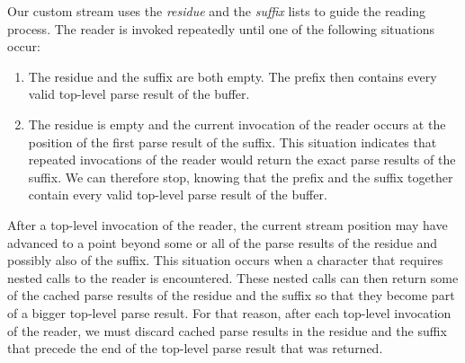 Our custom stream uses the \emph{residue} and the \emph{suffix} lists
to guide the reading process.  The reader is invoked repeatedly until
one of the following situations occur:

\begin{enumerate}
\item The residue and the suffix are both empty.  The prefix then
  contains every valid top-level parse result of the buffer.
\item The residue is empty and the current invocation of the reader
  occurs at the position of the first parse result of the suffix.
  This situation indicates that repeated invocations of the reader
  would return the exact parse results of the suffix.  We can
  therefore stop, knowing that the prefix and the suffix together
  contain every valid top-level parse result of the buffer.
\end{enumerate}

After a top-level invocation of the reader, the current stream
position may have advanced to a point beyond some or all of the parse
results of the residue and possibly also of the suffix.  This
situation occurs when a character that requires nested calls to the
reader is encountered.  These nested calls can then return some of the
cached parse results of the residue and the suffix so that they become
part of a bigger top-level parse result.  For that reason, after each
top-level invocation of the reader, we must discard cached parse
results in the residue and the suffix that precede the end of the
top-level parse result that was returned.
